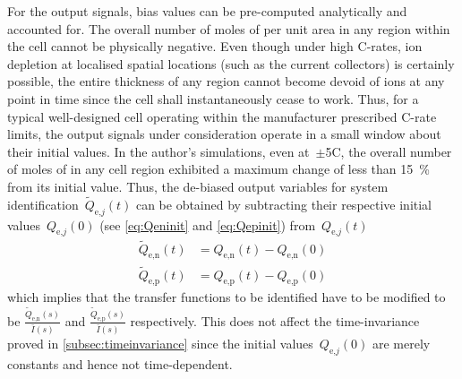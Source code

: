 For the output signals, bias  values can be pre-computed analytically and
accounted for.  The overall number  of moles of   per unit area  in any
region within  the cell cannot  be physically  negative. Even though  under high
C-rates,  ion depletion  at localised  spatial  locations (such  as the  current
collectors) is  certainly possible,  the entire thickness  of any  region cannot
become devoid of ions at any point  in time since the cell shall instantaneously
cease  to work.  Thus, for  a typical  well-designed cell  operating within  the
manufacturer prescribed  C-rate limits,  the output signals  under consideration
operate  in  a  small  window  about  their  initial  values.  In  the  author's
simulations, even  at~$\pm$5C, the overall  number of moles of   in any
cell region exhibited  a maximum change of less than  \SI{15}{\percent} from its
initial value. Thus,  the de-biased output variables  for system identification~$\widetilde{Q}_{\text{e,}j}(t)$ can be obtained  by subtracting their respective
initial values~$Q_{\text{e,}j}(0)$ (see \cref{eq:Qeninit} and \cref{eq:Qepinit})
from~$Q_{\text{e,}j}(t)$
\begin{align}
    \widetilde{Q}_\text{e,n}(t) & = {Q}_\text{e,n}(t) - {Q}_\text{e,n}(0) \\
    \widetilde{Q}_\text{e,p}(t) & = {Q}_\text{e,p}(t) - {Q}_\text{e,p}(0)
\end{align}
which  implies   that  the   transfer  functions  to   be  identified   have  to
be   modified   to   be   $\frac{\widetilde{Q}_\text{e,n}(s)}{\bar{I}(s)}$   and
$\frac{\widetilde{Q}_\text{e,p}(s)}{\bar{I}(s)}$  respectively.  This  does  not
affect  the  time-invariance  proved in \cref{subsec:timeinvariance}  since  the
initial  values~$Q_{\text{e,}j}(0)$  are   merely  constants  and   hence  not
time-dependent.

